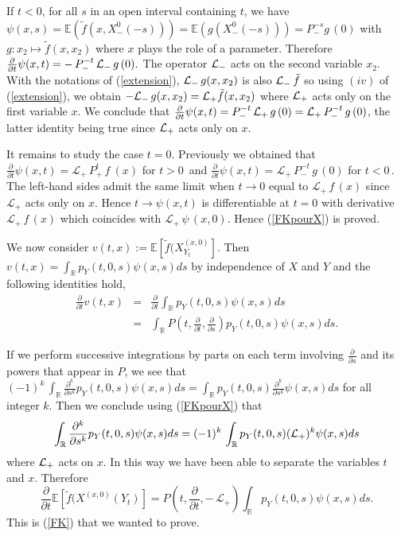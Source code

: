 \documentclass[a4paper, 11pt]{article}
\newcommand{\R}{\mathbb{R}}
\newcommand{\E}{\mathbb{E}}
\newcommand{\1}{\mathbf{1}}
\begin{document}
\noindent If $t<0$, for all $s$ in an open interval containing $t$, we have $\psi(x,s)=\E(\tilde{f}(x,X_-^0(-s)))=\E(g(X_-^0(-s)))=P_-^{-s}g\, (0)$ with $g: x_2\mapsto \tilde {f}(x,x_2)$ where $x$ plays the role of a parameter. Therefore $\frac{\partial}{\partial t}\psi(x,t)=-\, P_-^{-t}\, {\cal L}_- \, g\, (0).$ The operator ${\cal L}_-$ acts on the second variable $x_2$. With the notations of (\ref{extension}), ${\cal L}_- \, g(x,x_2)$ is also ${\cal L}_- \, \tilde{f}$ so using $(iv)$ of (\ref{extension}), we obtain $-{\cal L}_- \, g(x,x_2)={\cal L}_+\tilde{f}(x,x_2)$ where ${\cal L}_+$ acts only on the first variable $x$. We conclude that $\frac{\partial}{\partial t}\psi(x,t)=P_-^{-t}\, {\cal L}_+\, g\, (0)={\cal L}_+\, P_-^{-t}\, g\, (0)$, the latter identity being true since ${\cal L}_+$ acts only on $x$. 

\noindent It remains to study the case $t=0$. Previously we obtained that $\frac{\partial}{\partial t}\psi(x,t)=\mathcal{L}_+\, P_+^t\,  f\ (x)$ for $t>0\, $ and $\frac{\partial}{\partial t} \psi(x,t)=\mathcal{L}_+\, P_-^{-t}\,  g\, (0)$ for $t<0\, $. The left-hand sides admit the same limit when $t\rightarrow 0$ equal to  $\mathcal{L}_+\, f\, (x)$ since $\mathcal{L}_+$ acts only on $x$. Hence $t\rightarrow \psi(x,t)$ is differentiable at $t=0$ with derivative $\mathcal{L}_+\, f\, (x)$ which coincides with $\mathcal{L}_+\, \psi\, (x,0)$. Hence (\ref{FKpourX}) is proved. 


\noindent We now consider $v(t,x):=\E\left[\tilde{f}(X^{(x,0)}_{Y_t}\right]$. Then $v(t,x)=\int_\R p_Y(t,0,s)\psi(x,s)ds$ by independence of $X$ and $Y$ and the following identities hold,
\begin{eqnarray*}
\frac{\partial}{\partial t}v(t,x)&=&\frac{\partial}{\partial t}\int_\R p_Y(t,0,s)\psi(x,s)ds\\
&=&\int_\R P(t,\frac{\partial}{\partial t},\frac{\partial}{\partial s})p_Y(t,0,s)\psi(x,s)ds.
\end{eqnarray*}

If we perform successive integrations by parts on each term involving $\frac{\partial}{\partial s}$ and its powers that appear in $P$, we see that ${(-1)}^k\, \int_\R \frac{\partial^k}{\partial s^k}p_Y(t,0,s)\psi(x,s)ds=\int_\R p_Y(t,0,s)\frac{\partial^k}{\partial s^k}\psi(x,s)ds$ for all integer $k$. Then we conclude using (\ref{FKpourX}) that
\begin{equation*}
\int_\R \frac{\partial^k}{\partial s^k}p_Y(t,0,s)\psi(x,s)ds=(-1)^k\, \int_\R p_Y(t,0,s)({\cal L_+})^k\psi(x,s)ds
\end{equation*} 
where ${\cal L_+}$ acts on $x$. In this way we have been able to separate the variables $t$ and $x$. Therefore
\begin{equation*}
\frac{\partial}{\partial t}\E\left[\tilde{f}(X^{(x,0)}(Y_t)\right]=P(t,\frac{\partial}{\partial t},-\, \mathcal{L}_+) \int_\R p_Y(t,0,s)\psi(x,s)ds.
\end{equation*}
This is  (\ref{FK}) that we wanted to prove. \hfill \framebox[0.6em]{}
\end{document}
